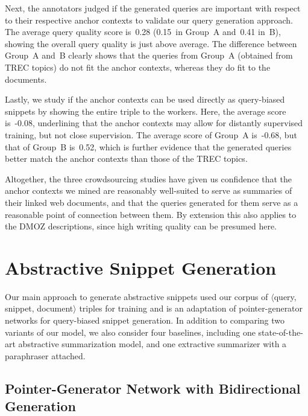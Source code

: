 \documentclass[sigconf]{acmart}
\begin{document}
Next, the annotators judged if the generated queries are important with respect to their respective anchor contexts to validate our query generation approach. The average query quality score is~0.28 (0.15~in Group~A and~0.41 in~B), showing the overall query quality is just above average. The difference between Group~A and~B clearly shows that the queries from Group~A (obtained from TREC topics) do not fit the anchor contexts, whereas they do fit to the documents.

Lastly, we study if the anchor contexts can be used directly as query-biased snippets by showing the entire triple to the workers. Here, the average score is~-0.08, underlining that the anchor contexts may allow for distantly supervised training, but not close supervision. The average score of Group~A is~-0.68, but that of Group~B is~0.52, which is further evidence that the generated queries better match the anchor contexts than those of the TREC topics.

Altogether, the three crowdsourcing studies have given us confidence that the anchor contexts we mined are reasonably well-suited to serve as summaries of their linked web documents, and that the queries generated for them serve as a reasonable point of connection between them. By extension this also applies to the DMOZ descriptions, since high writing quality can be presumed here.
 \section{Abstractive Snippet Generation}
\label{abstractive-snippet-generation}

Our main approach to generate abstractive snippets used our corpus of $\langle$query, snippet, document$\rangle$ triples for training and is an adaptation of pointer-generator networks for query-biased snippet generation. In addition to comparing two variants of our model, we also consider four baselines, including one state-of-the-art abstractive summarization model, and one extractive summarizer with a paraphraser attached.

\subsection{Pointer-Generator Network with Bidirectional Generation}
\end{document}
